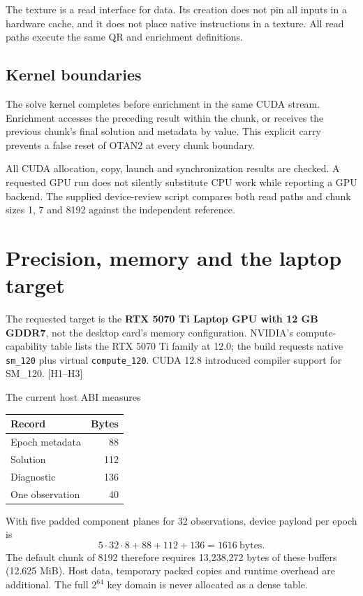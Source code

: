 \documentclass[11pt,a4paper]{article}
\newcommand{\code}[1]{\texttt{#1}}
\begin{document}
The texture is a read interface for data. Its creation does not pin all inputs in a hardware cache, and it does
not place native instructions in a texture. All read paths execute the same QR and enrichment definitions.

\subsection{Kernel boundaries}
The solve kernel completes before enrichment in the same CUDA stream. Enrichment accesses the preceding
result within the chunk, or receives the previous chunk's final solution and metadata by value. This explicit
carry prevents a false reset of OTAN2 at every chunk boundary.

All CUDA allocation, copy, launch and synchronization results are checked. A requested GPU run does not
silently substitute CPU work while reporting a GPU backend. The supplied device-review script compares
both read paths and chunk sizes 1, 7 and 8192 against the independent reference.
\clearpage

\section{Precision, memory and the laptop target}
The requested target is the \textbf{RTX 5070 Ti Laptop GPU with 12 GB GDDR7}, not the desktop card's memory
configuration. NVIDIA's compute-capability table lists the RTX 5070 Ti family at 12.0; the build requests
native \code{sm\_120} plus virtual \code{compute\_120}. CUDA 12.8 introduced compiler support for SM\_120.
[H1--H3]

The current host ABI measures
\begin{center}
\begin{tabular}{@{}lr@{}}\toprule
\textbf{Record} & \textbf{Bytes}\\\midrule
Epoch metadata & 88\\
Solution & 112\\
Diagnostic & 136\\
One observation & 40\\\bottomrule
\end{tabular}
\end{center}
With five padded component planes for 32 observations, device payload per epoch is
\begin{equation}
5\cdot32\cdot8+88+112+136=1616\ \mathrm{bytes}.
\end{equation}
The default chunk of 8192 therefore requires 13,238,272 bytes of these buffers (12.625 MiB).
Host data, temporary packed copies and runtime overhead are additional. The full $2^{64}$ key domain is
never allocated as a dense table.
\end{document}
